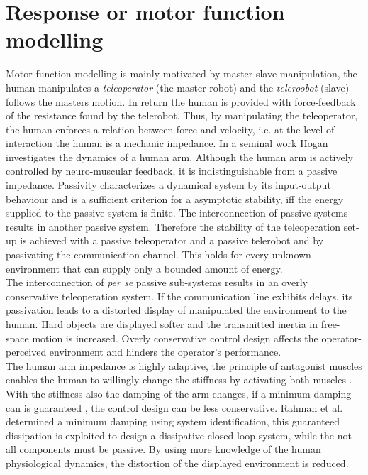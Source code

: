 \documentclass[a4paper,twoside, openright,12pt]{report}
\begin{document}
\section{Response or motor function modelling}
Motor function modelling is mainly motivated by master-slave manipulation, the human manipulates a \emph{teleoperator} (the master robot) and the \emph{teleroobot} (slave) follows the masters motion. In return the human is provided with force-feedback of the resistance found by the telerobot. Thus, by manipulating the teleoperator, the human enforces a relation between force and velocity, i.e. at the level of interaction the human is a mechanic impedance. In a seminal work Hogan \cite{Hogan_89} investigates the dynamics of a human arm. Although the human arm is actively controlled by neuro-muscular feedback, it is indistinguishable from a passive impedance. Passivity characterizes a dynamical system by its input-output behaviour and is a sufficient criterion for a asymptotic stability, iff the energy supplied to the passive system is finite. The interconnection of passive systems results in another passive system. Therefore the stability of the teleoperation set-up is achieved with a passive teleoperator and a passive telerobot and by passivating the communication channel. This holds for every unknown environment that can supply only a bounded amount of energy.\\
The interconnection of \emph{per se} passive sub-systems results in an overly conservative teleoperation system. If the communication line exhibits delays, its passivation leads to a distorted display of manipulated the environment to the human. Hard objects are displayed softer and the transmitted inertia in free-space motion is increased. Overly conservative control design affects the operator-perceived environment and hinders the operator's performance.\\
The human arm impedance is highly adaptive, the principle of antagonist muscles enables the human to willingly change the stiffness by activating both muscles \cite{Rahman99}. With the stiffness also the damping of the arm changes, if a minimum damping can is guaranteed , the control design can be less conservative. Rahman et al. determined a minimum damping using system identification, this guaranteed dissipation is exploited to design a dissipative closed loop system, while the not all components must be passive. 
By using more knowledge of the human physiological dynamics, the distortion of the displayed environment is reduced.\\
\end{document}

